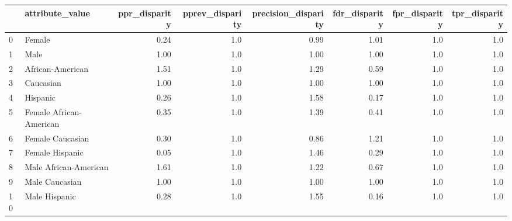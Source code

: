\begin{tabular}{llrrrrrr}
\toprule
{} &          attribute\_value &  ppr\_disparity &  pprev\_disparity &  precision\_disparity &  fdr\_disparity &  fpr\_disparity &  tpr\_disparity \\
\midrule
0  &                   Female &           0.24 &              1.0 &                 0.99 &           1.01 &            1.0 &            1.0 \\
1  &                     Male &           1.00 &              1.0 &                 1.00 &           1.00 &            1.0 &            1.0 \\
2  &         African-American &           1.51 &              1.0 &                 1.29 &           0.59 &            1.0 &            1.0 \\
3  &                Caucasian &           1.00 &              1.0 &                 1.00 &           1.00 &            1.0 &            1.0 \\
4  &                 Hispanic &           0.26 &              1.0 &                 1.58 &           0.17 &            1.0 &            1.0 \\
5  &  Female African-American &           0.35 &              1.0 &                 1.39 &           0.41 &            1.0 &            1.0 \\
6  &         Female Caucasian &           0.30 &              1.0 &                 0.86 &           1.21 &            1.0 &            1.0 \\
7  &          Female Hispanic &           0.05 &              1.0 &                 1.46 &           0.29 &            1.0 &            1.0 \\
8  &    Male African-American &           1.61 &              1.0 &                 1.22 &           0.67 &            1.0 &            1.0 \\
9  &           Male Caucasian &           1.00 &              1.0 &                 1.00 &           1.00 &            1.0 &            1.0 \\
10 &            Male Hispanic &           0.28 &              1.0 &                 1.55 &           0.16 &            1.0 &            1.0 \\
\bottomrule
\end{tabular}
